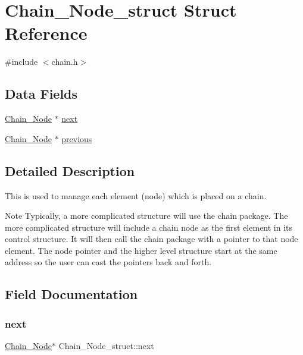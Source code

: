 \hypertarget{structChain__Node__struct}{}\section{Chain\+\_\+\+Node\+\_\+struct Struct Reference}
\label{structChain__Node__struct}


{\ttfamily \#include $<$chain.\+h$>$}

\subsection*{Data Fields}
\begin{DoxyCompactItemize}
\item 
\mbox{\hyperlink{group__RTEMSScoreChain_ga0dd4bfcca1ac7f90de2842e447846d3d}{Chain\+\_\+\+Node}} $\ast$ \mbox{\hyperlink{structChain__Node__struct_aa32e123f6260587baefe0e3817845600}{next}}
\item 
\mbox{\hyperlink{group__RTEMSScoreChain_ga0dd4bfcca1ac7f90de2842e447846d3d}{Chain\+\_\+\+Node}} $\ast$ \mbox{\hyperlink{structChain__Node__struct_a17c1c8c2bc86cbb75f64de710fafd576}{previous}}
\end{DoxyCompactItemize}


\subsection{Detailed Description}
This is used to manage each element (node) which is placed on a chain.

\begin{DoxyNote}{Note}
Typically, a more complicated structure will use the chain package. The more complicated structure will include a chain node as the first element in its control structure. It will then call the chain package with a pointer to that node element. The node pointer and the higher level structure start at the same address so the user can cast the pointers back and forth. 
\end{DoxyNote}


\subsection{Field Documentation}
\mbox{\label{structChain__Node__struct_aa32e123f6260587baefe0e3817845600}} 
\subsubsection{\texorpdfstring{next}{next}}
{\footnotesize\ttfamily \mbox{\hyperlink{group__RTEMSScoreChain_ga0dd4bfcca1ac7f90de2842e447846d3d}{Chain\+\_\+\+Node}}$\ast$ Chain\+\_\+\+Node\+\_\+struct\+::next}

